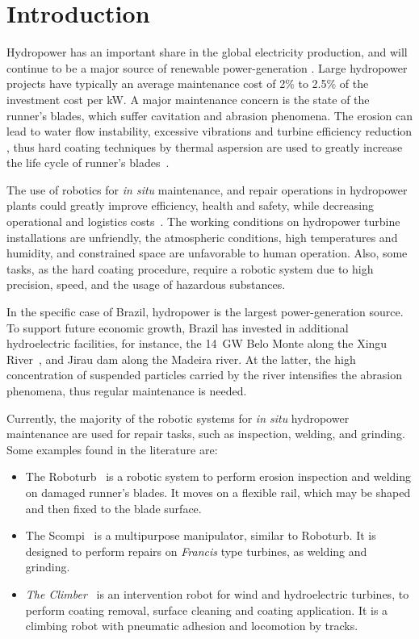 \section{Introduction}

Hydropower has an important share in the global electricity production, and
will continue to be a major source of renewable power-generation \cite{iea}.
Large hydropower projects have typically an ave\-rage maintenance cost of 2\%
to 2.5\% of the investment cost per kW. A major maintenance concern
is the state of the runner's blades, which suffer cavitation and abrasion phenomena. The erosion can lead to water flow instability, excessive
vibrations and turbine efficiency reduction \cite{goldemberg2007energia}, thus
hard coating techniques by thermal aspersion are used to greatly increase the
life cycle of runner's blades~\cite{krella2011new}.

The use of robotics for \textit{in situ} maintenance, and repair operations in
hydropower plants could greatly improve efficiency, health and safety, while
decreasing operational and logistics costs~\cite{hazel2012field}. The working
conditions on hydropower turbine installations are unfriendly, the atmospheric
conditions, high temperatures and humidity, and constrained space are
unfavorable to human operation. Also, some tasks, as the hard coating
procedure, require a robotic system due to high precision, speed, and the
usage of hazardous substances.

In the specific case of Brazil, hydropower is the largest
power-generation source. To support future economic growth, Brazil has
invested in additional hydroelectric facilities, for instance, the
14~GW Belo Monte along the Xingu River~\cite{eia}, and Jirau dam
along the Madeira river. At the latter, the high concentration of suspended
particles carried by the river intensifies the abrasion phenomena, thus
regular maintenance is needed.

Currently, the majority of the robotic systems for \textit{in situ} hydropower
maintenance are used for repair tasks, such as inspection, welding, and
grinding. Some examples found in the literature are:

\begin{itemize}
\item The Roboturb~\cite{roboturb} is a robotic system to perform erosion
inspection and welding on damaged runner's blades. It moves on a flexible rail,
which may be shaped and then fixed to the blade surface.

\item The Scompi~\cite{scompi} is a multipurpose manipulator, similar to
Roboturb.
It is designed to perform repairs on \textit{Francis} type turbines, as welding and
grinding.

\item \textit{The Climber}~\cite{icm} is an intervention robot for wind and
hydroelectric turbines, to perform coating removal, surface cleaning and
coating application. It is a climbing robot with pneumatic adhesion and
locomotion by tracks.
\end{itemize}

